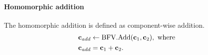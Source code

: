 \documentclass[../main.tex]{subfiles}
\begin{document}

\paragraph{Homomorphic addition}
The homomorphic addition is defined as component-wise addition. %
\begin{align*}
    &\vc{c}_{add} \leftarrow \bfv.\add(\vc{c}_1, \vc{c}_2), \text{ where }\\
    &\vc{c}_{add}= \vc{c}_1 + \vc{c}_2. %
\end{align*}
\end{document}
